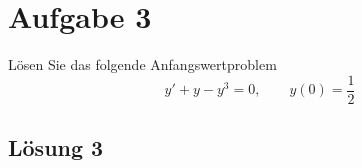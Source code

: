 \documentclass[main.tex]{subfiles}
\begin{document}
\section{Aufgabe 3}
Lösen Sie das folgende Anfangswertproblem
\[
y' + y - y^3 = 0, \qquad y(0) = \frac{1}{2}
\]

\subsection{Lösung 3}
\end{document}
